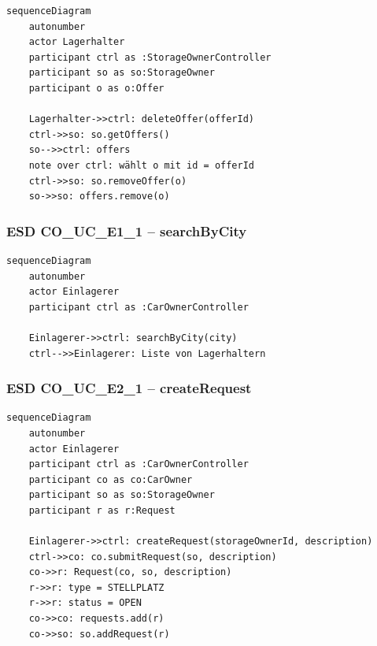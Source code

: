 \begin{lstlisting}[basicstyle=\ttfamily\small, breaklines=true]
sequenceDiagram
    autonumber
    actor Lagerhalter
    participant ctrl as :StorageOwnerController
    participant so as so:StorageOwner
    participant o as o:Offer

    Lagerhalter->>ctrl: deleteOffer(offerId)
    ctrl->>so: so.getOffers()
    so-->>ctrl: offers
    note over ctrl: wählt o mit id = offerId
    ctrl->>so: so.removeOffer(o)
    so->>so: offers.remove(o)
\end{lstlisting}

\newpage

{}
\subsubsection*{ESD CO\_UC\_E1\_1 – searchByCity}

\begin{lstlisting}[basicstyle=\ttfamily\small, breaklines=true]
sequenceDiagram
    autonumber
    actor Einlagerer
    participant ctrl as :CarOwnerController

    Einlagerer->>ctrl: searchByCity(city)
    ctrl-->>Einlagerer: Liste von Lagerhaltern
\end{lstlisting}

\newpage

{}
\subsubsection*{ESD CO\_UC\_E2\_1 – createRequest}

\begin{lstlisting}[basicstyle=\ttfamily\small, breaklines=true]
sequenceDiagram
    autonumber
    actor Einlagerer
    participant ctrl as :CarOwnerController
    participant co as co:CarOwner
    participant so as so:StorageOwner
    participant r as r:Request

    Einlagerer->>ctrl: createRequest(storageOwnerId, description)
    ctrl->>co: co.submitRequest(so, description)
    co->>r: Request(co, so, description)
    r->>r: type = STELLPLATZ
    r->>r: status = OPEN
    co->>co: requests.add(r)
    co->>so: so.addRequest(r)
\end{lstlisting}

